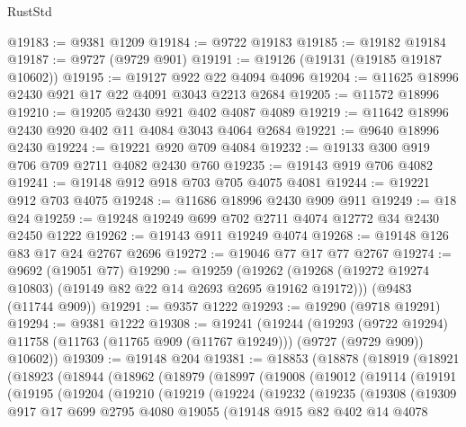 \begin{lexlean}{RustStd}
\begin{coremodule}
{\begin{coremodule}
{{{{{{{{{{{{{{{{{{{{{{{{{{{{{{{{{{{{{{{{{{{{{{{{{{{{{{{@19183 := @9381 @1209
@19184 := @9722 @19183
@19185 := @19182 @19184
@19187 := @9727 (@9729 @901)
@19191 := @19126 (@19131 (@19185 @19187 @10602))
@19195 := @19127 @922 @22 @4094 @4096
@19204 := @11625 @18996 @2430 @921 @17 @22 @4091 @3043 @2213 @2684
@19205 := @11572 @18996
@19210 := @19205 @2430 @921 @402 @4087 @4089
@19219 := @11642 @18996 @2430 @920 @402 @11 @4084 @3043 @4064 @2684
@19221 := @9640 @18996 @2430
@19224 := @19221 @920 @709 @4084
@19232 := @19133 @300 @919 @706 @709 @2711 @4082 @2430 @760
@19235 := @19143 @919 @706 @4082
@19241 := @19148 @912 @918 @703 @705 @4075 @4081
@19244 := @19221 @912 @703 @4075
@19248 := @11686 @18996 @2430 @909 @911
@19249 := @18 @24
@19259 := @19248 @19249 @699 @702 @2711 @4074 @12772 @34 @2430 @2450 @1222
@19262 := @19143 @911 @19249 @4074
@19268 := @19148 @126 @83 @17 @24 @2767 @2696
@19272 := @19046 @77 @17 @77 @2767
@19274 := @9692 (@19051 @77)
@19290 := @19259
    (@19262 (@19268 (@19272 @19274 @10803) (@19149 @82 @22 @14 @2693 @2695 @19162 @19172)))
    (@9483 (@11744 @909))
@19291 := @9357 @1222
@19293 := @19290 (@9718 @19291)
@19294 := @9381 @1222
@19308 := @19241
    (@19244
      (@19293
        (@9722 @19294)
        @11758
        (@11763 (@11765 @909 (@11767 @19249)))
        (@9727 (@9729 @909))
        @10602))
@19309 := @19148 @204
@19381 := @18853
    (@18878
      (@18919
        (@18921
          (@18923
            (@18944
              (@18962
                (@18979
                  (@18997
                    (@19008
                      (@19012
                        (@19114
                          (@19191
                            (@19195
                              (@19204
                                (@19210
                                  (@19219
                                    (@19224
                                      (@19232
                                        (@19235
                                          (@19308
                                            (@19309
                                              @917
                                              @17
                                              @699
                                              @2795
                                              @4080
                                              @19055
                                              (@19148
                                                @915
                                                @82
                                                @402
                                                @14
                                                @4078
}}}}}}}}}}}}}}}}}}}}}}}}}}}}}}}}}}}}}}}}}}}}}}}}}}}}}}}
\end{coremodule}}
\end{coremodule}
\end{lexlean}
